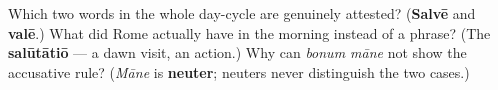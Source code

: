 \begin{tcolorbox}[breakable,colback=teal!4,colframe=teal!35!black,title={Before you move on}]
Which two words in the whole day-cycle are genuinely attested? (\textbf{Salvē} and \textbf{valē}.) What did Rome actually have in the morning instead of a phrase? (The \textbf{salūtātiō} — a dawn visit, an action.) Why can \emph{bonum māne} not show the accusative rule? (\emph{Māne} is \textbf{neuter}; neuters never distinguish the two cases.)
\end{tcolorbox}
